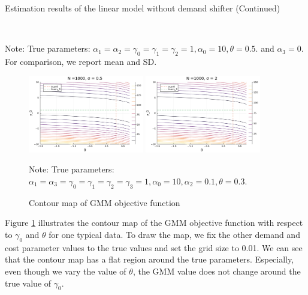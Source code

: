 \documentclass[11pt, a4paper]{article}
\begin{document}
\begin{table}[!htbp]
  \ContinuedFloat
  \begin{center}
      \caption{Estimation results of the linear model without demand shifter (Continued)}
      \subfloat[$\sigma=1.0$]{}\\
    \subfloat[$\sigma=2.0$]{}
  \end{center}\footnotesize
  Note: True parameters: $\alpha_1 = \alpha_2 =  \gamma_0 = \gamma_1 = \gamma_2  =  1, \alpha_0 = 10, \theta = 0.5.$ and $\alpha_3 =0$. For comparison, we report mean and SD.
\end{table} 

\begin{figure}[!htbp]
  \begin{center}
  \includegraphics[width = 0.45\textwidth]
  {figuretable/contour_loglinear_loglinear_n_1000_sigma_0.5.pdf}
  \includegraphics[width = 0.45\textwidth]
  {figuretable/contour_loglinear_loglinear_n_1000_sigma_2.pdf}
  \caption{Contour map of GMM objective function}
  \label{fg:contour_loglinear_loglinear_n_1000_sigma_2} 
  \end{center}
  \footnotesize
  Note: True parameters: $\alpha_1 = \alpha_3 = \gamma_0 = \gamma_1 = \gamma_2  = \gamma_3 = 1, \alpha_0 = 10, \alpha_2 = 0.1,  \theta = 0.3.$
\end{figure} 

Figure \ref{fg:contour_loglinear_loglinear_n_1000_sigma_2} illustrates the contour map of the GMM objective function with respect to $\gamma_0$ and $\theta$ for one typical data.
To draw the map, we fix the other demand and cost parameter values to the true values and set the grid size to 0.01.
We can see that the contour map has a flat region around the true parameters.
Especially, even though we vary the value of $\theta$, the GMM value does not change around the true value of $\gamma_0$.
\end{document}
